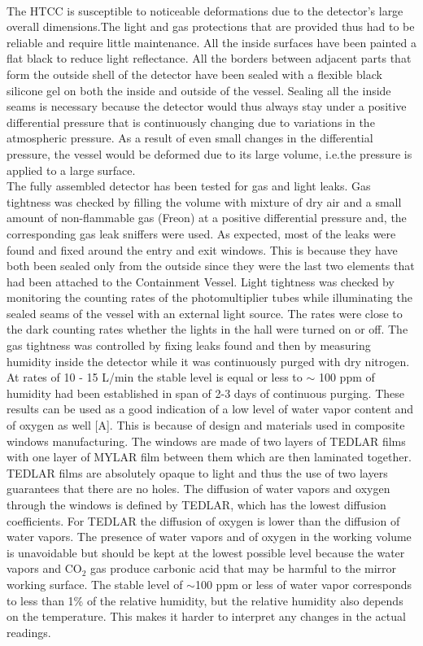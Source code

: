 \\
\indent The HTCC is susceptible to noticeable deformations due to the detector's large overall dimensions.The light and gas protections that are provided thus had to be reliable and require little maintenance. All the inside surfaces have been painted a flat black to reduce light reflectance. All the borders between adjacent parts that form the outside shell of the detector have been sealed with a flexible black silicone gel on both the inside and outside of the vessel. Sealing all the inside seams is necessary because the detector would thus always stay under a positive differential pressure that is continuously changing due to variations in the atmospheric pressure. As a result of even small changes in the differential pressure, the vessel would be deformed due to its large volume, i.e.the pressure is applied to a large surface. 
\\
\indent The fully assembled detector has been tested for gas and light leaks. Gas tightness was checked by filling the volume with mixture of dry air and a small amount of non-flammable gas (Freon) at a positive differential pressure and, the corresponding gas leak sniffers were used. As expected, most of the leaks were found and fixed around the entry and exit windows. This is because they have both been sealed only from the outside since they were the last two elements that had been attached to the Containment Vessel. Light tightness was checked by monitoring the counting rates of the photomultiplier tubes while illuminating the sealed seams of the vessel with an external light source. The rates were close to the dark counting rates whether the lights in the hall were turned on or off. The gas tightness was controlled by fixing leaks found and then by measuring humidity inside the detector while it was continuously purged with dry nitrogen. At rates of 10 - 15 L/min the stable level is equal or less to $\sim$ 100 ppm of humidity had been established in span of 2-3 days of continuous purging. These results can be used as a good indication of a low level of water vapor content and of oxygen as well [A]. This is because of design and materials used in composite windows manufacturing. The windows are made of two layers of TEDLAR films with one layer of MYLAR film between them which are then laminated together. TEDLAR films are absolutely opaque to light and thus the use of two layers guarantees that there are no holes. The diffusion of water vapors and oxygen through the windows is defined by TEDLAR, which has the lowest diffusion coefficients. For TEDLAR the diffusion of oxygen is lower than the diffusion of water vapors. The presence of water vapors and of oxygen in the working volume is unavoidable but should be kept at the lowest possible level because the water vapors and CO${_2}$ gas produce carbonic acid that may be harmful to the mirror working surface. The stable level of $\sim$100 ppm or less of water vapor corresponds to less than 1\% of the relative humidity, but the relative humidity also depends on the temperature. This makes it harder to interpret any changes in the actual readings.
